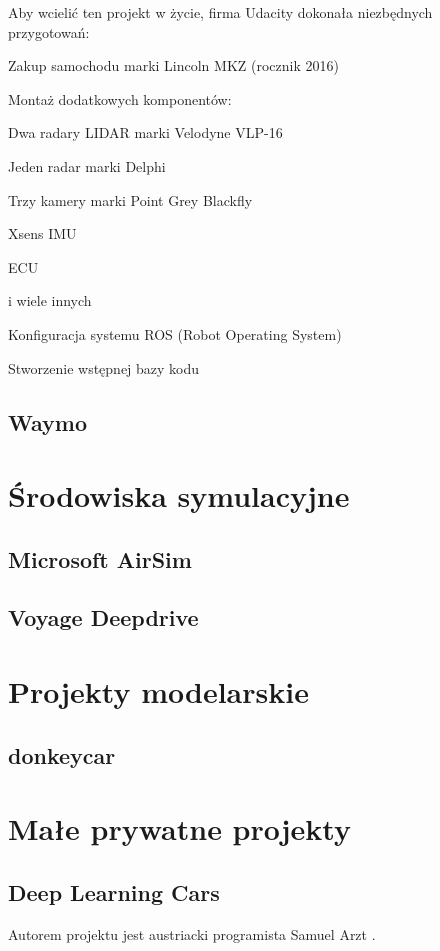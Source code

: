 Aby wcielić ten projekt w życie, firma Udacity dokonała niezbędnych przygotowań:
\begin{enumerate*}
\item Zakup samochodu marki Lincoln MKZ (rocznik 2016)
\item Montaż dodatkowych komponentów:
\begin{itemize*}
\item Dwa radary LIDAR marki Velodyne VLP-16
\item Jeden radar marki Delphi
\item Trzy kamery marki Point Grey Blackfly
\item Xsens IMU \cite{imu:wikipedia}
\item ECU \cite{ecu:wikipedia}
\item i wiele innych
\end{itemize*}
\item Konfiguracja systemu ROS (Robot Operating System) \cite{ros:about}
\item Stworzenie wstępnej bazy kodu
\end{enumerate*}


\subsection{Waymo}
\section{Środowiska symulacyjne}
\subsection{Microsoft AirSim}
\subsection{Voyage Deepdrive}
\section{Projekty modelarskie}
\subsection{donkeycar}
\section{Małe prywatne projekty}
\subsection{Deep Learning Cars}
Autorem projektu jest austriacki programista Samuel Arzt \cite{artz:deepLearningCars:blog} \cite{artz:deepLearningCars:github}. \\

